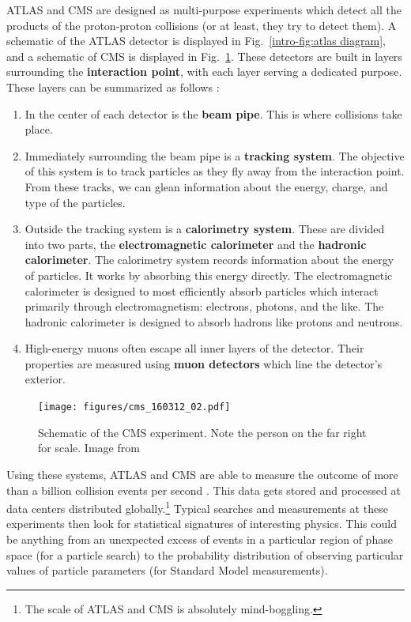 \documentclass[../thesis.tex]{subfiles}
\begin{document}
	ATLAS and CMS are designed as multi-purpose experiments which detect all the products of the proton-proton collisions (or at least, they try to detect them). A schematic of the ATLAS detector is displayed in Fig.~\ref{intro-fig:atlas diagram}, and a schematic of CMS is displayed in Fig.~\ref{intro-fig:cms diagram}. These detectors are built in layers surrounding the \textbf{interaction point}, with each layer serving a dedicated purpose. These layers can be summarized as follows \cite{larkoski_elementary_2019-1}:
	\begin{enumerate}
		\item In the center of each detector is the \textbf{beam pipe}. This is where collisions take place.

		\item Immediately surrounding the beam pipe is a \textbf{tracking system}. The objective of this system is to track particles as they fly away from the interaction point. From these tracks, we can glean information about the energy, charge, and type of the particles.

		\item Outside the tracking system is a \textbf{calorimetry system}. These are divided into two parts, the \textbf{electromagnetic calorimeter} and the \textbf{hadronic calorimeter}. The calorimetry system records information about the energy of particles. It works by absorbing this energy directly. The electromagnetic calorimeter is designed to most efficiently absorb particles which interact primarily through electromagnetism: electrons, photons, and the like. The hadronic calorimeter is designed to absorb hadrons like protons and neutrons.

		\item High-energy muons often escape all inner layers of the detector. Their properties are measured using \textbf{muon detectors} which line the detector's exterior.
	\end{enumerate}

	\begin{figure}
	\begin{center}
		\texttt{[image: figures/cms\_160312\_02.pdf]}
		\caption{\label{intro-fig:cms diagram}Schematic of the CMS experiment. Note the person on the far right for scale. Image from \cite{sakuma_detector_2014}}
	\end{center}
	\end{figure}

	Using these systems, ATLAS and CMS are able to measure the outcome of more than a billion collision events per second \cite{atlas_outreach_atlas_2012}. This data gets stored and processed at data centers distributed globally.\footnote{The scale of ATLAS and CMS is absolutely mind-boggling.} Typical searches and measurements at these experiments then look for statistical signatures of interesting physics. This could be anything from an unexpected excess of events in a particular region of phase space (for a particle search) to the probability distribution of observing particular values of particle parameters (for Standard Model measurements). 
\end{document}
